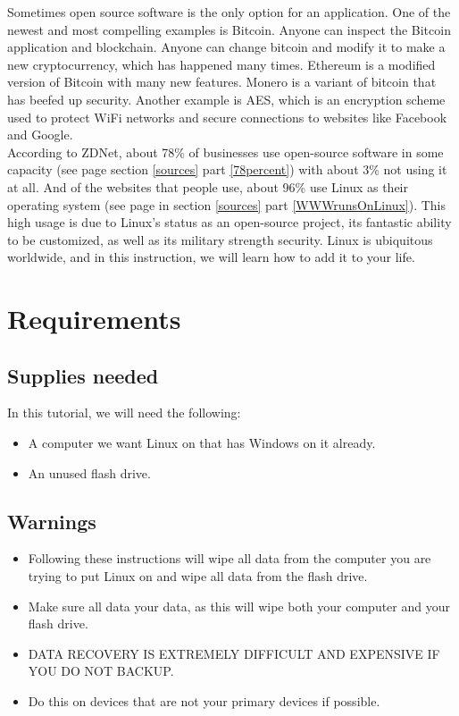 \documentclass{article}
\begin{document}
Sometimes open source software is the only option for an application. One of the newest and most compelling examples is Bitcoin. Anyone can inspect the Bitcoin application and blockchain. Anyone can change bitcoin and modify it to make a new cryptocurrency, which has happened many times. Ethereum is a modified version of Bitcoin with many new features. Monero is a variant of bitcoin that has beefed up security. Another example is AES, which is an encryption scheme used to protect WiFi networks and secure connections to websites like Facebook and Google.
\\
According to ZDNet, about 78\% of businesses use open-source software in some capacity (see page \pageref{78percent} section \ref{sources} part \ref{78percent}) with about 3\% not using it at all. And of the websites that people use, about 96\% use Linux as their operating system (see page \pageref{WWWrunsOnLinux} in section \ref{sources} part \ref{WWWrunsOnLinux}). This high usage is due to Linux's status as an open-source project, its fantastic ability to be customized, as well as its military strength security. Linux is ubiquitous worldwide, and in this instruction, we will learn how to add it to your life.

\section{Requirements}
\subsection{Supplies needed}
In this tutorial, we will need the following:
\begin{itemize}
    \item A computer we want Linux on that has Windows on it already.
    \item An unused flash drive.
\end{itemize}

\subsection{Warnings}
\begin{itemize}
    \item Following these instructions will wipe all data from the computer you are trying to put Linux on and wipe all data from the flash drive.
    \item Make sure all data your data, as this will wipe both your computer and your flash drive.
    \item DATA RECOVERY IS EXTREMELY DIFFICULT AND EXPENSIVE IF YOU DO NOT BACKUP.
    \item Do this on devices that are not your primary devices if possible.
\end{itemize}
\end{document}
